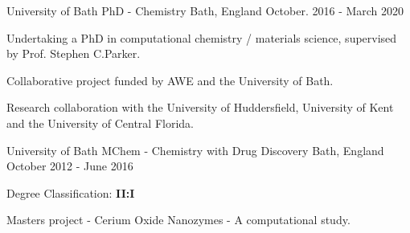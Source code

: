 \begin{cventries}
  \cventry
    {University of Bath}
    {PhD - Chemistry}
    {Bath, England}
    {October. 2016 - March 2020}
    {
      \begin{cvitems}
        \item {Undertaking a PhD in computational chemistry / materials science, supervised by Prof. Stephen C.Parker.}
        \item {Collaborative project funded by AWE and the University of Bath.}
        \item{Research collaboration with the University of Huddersfield, University of Kent and the University of Central Florida.}
      \end{cvitems}
    }
\end{cventries}

\begin{cventries}
  \cventry
    {University of Bath}
    {MChem - Chemistry with Drug Discovery}
    {Bath, England}
    {October 2012 - June 2016}
    {
      \begin{cvitems}
        \item {Degree Classification: \textbf{II:I}}
        \item {Masters project - Cerium Oxide Nanozymes - A computational study.}
      \end{cvitems}
    }
\end{cventries}
